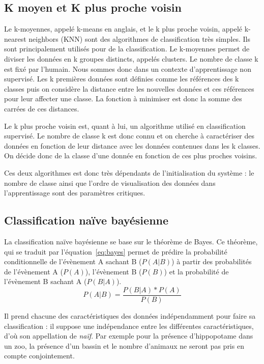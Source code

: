 \subsection{K moyen et K plus proche voisin}
Le k-moyennes, appelé k-means en anglais, et le k plus proche voisin, appelé k-nearest neighbors (KNN) sont des algorithmes de classification très simples. Ils sont principalement utilisés pour de la classification.
Le k-moyennes permet de diviser les données en k groupes distincts, appelés clusters. Le nombre de classe k est fixé par l'humain. Nous sommes donc dans un contexte d'apprentissage non supervisé.
Les k premières données sont définies comme les références des k classes puis on considère la distance entre les nouvelles données et ces références pour leur affecter une classe. La fonction à minimiser est donc la somme des carrées de ces distances.

Le k plus proche voisin est, quant à lui, un algorithme utilisé en classification supervisé. Le nombre de classe k est donc connu et on cherche à caractériser des données en fonction de leur distance avec les données contenues dans les k classes. On décide donc de la classe d'une donnée en fonction de ces plus proches voisins.

Ces deux algorithmes est donc très dépendants de l'initialisation du système : le nombre de classe ainsi que l'ordre de visualisation des données dans l'apprentissage sont des paramètres critiques.


\subsection{Classification naïve bayésienne}
La classification naïve bayésienne se base sur le théorème de Bayes. Ce théorème, qui se traduit par l'équation~\ref{eq:bayes} permet de prédire la probabilité conditionnelle de l'évènement A sachant B ($P(A|B)$) à partir des probabilités de l'évènement A ($P(A)$), l'évènement B ($P(B)$) et la probabilité de l'évènement B sachant A ($P(B|A)$).
\begin{equation}
    P(A|B) = \dfrac{P(B|A)*P(A)}{P(B)}
    \label{eq:bayes}
\end{equation}

Il prend chacune des caractéristiques des données indépendamment pour faire sa classification : il suppose une indépendance entre les différentes caractéristiques, d'où son appellation de \textit{naïf}. Par exemple pour la présence d'hippopotame dans un zoo, la présence d'un bassin et le nombre d'animaux ne seront pas pris en compte conjointement.

